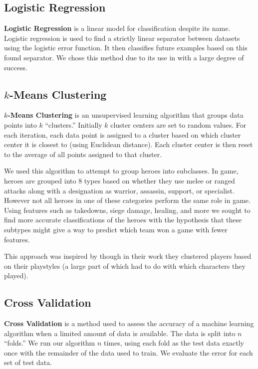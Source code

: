 \documentclass[11pt,letterpaper]{article}
\begin{document}
\subsection{Logistic Regression}
\textbf{Logistic Regression} is a linear model for classification despite its name. Logistic regression is used to find a strictly linear separator between datasets using the logistic error function. It then classifies future examples based on this found separator. We chose this method due to its use in \cite{ODP:15} with a large degree of success.

\subsection{$k$-Means Clustering}
\textbf{$k$-Means Clustering} is an unsupervised learning algorithm that groups data points into $k$ ``clusters.'' Initially $k$ cluster centers are set to random values. For each iteration, each data point is assigned to a cluster based on which cluster center it is closest to (using Euclidean distance). Each cluster center is then reset to the average of all points assigned to that cluster.

We used this algorithm to attempt to group heroes into subclasses. In game, heroes are grouped into 8 types based on whether they use melee or ranged attacks along with a designation as warrior, assassin, support, or specialist. However not all heroes in one of these categories perform the same role in game. Using features such as takedowns, siege damage, healing, and more we sought to find more accurate classifications of the heroes with the hypothesis that these subtypes might give a way to predict which team won a game with fewer features. 

This approach was inspired by \cite{ODP:15} though in their work they clustered players based on their playstyles (a large part of which had to do with which characters they played).

\subsection{Cross Validation}
\textbf{Cross Validation} is a method used to assess the accuracy of a machine learning algorithm when a limited amount of data is available. The data is split into $n$ ``folds.'' We run our algorithm $n$ times, using each fold as the test data exactly once with the remainder of the data used to train. We evaluate the error for each set of test data.
\end{document}
